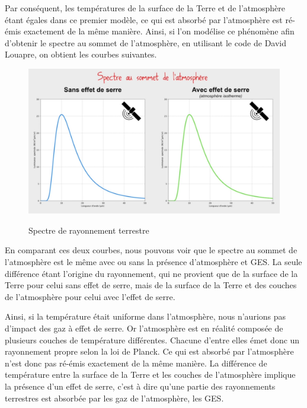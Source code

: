 \documentclass[a4paper, 12pt]{report} %
\newcommand{\figcaptionwithsource}[3]{\caption[#1 
            \newline #2]{#1} \addtocontents{lof}{\protect\vspace{1\baselineskip}}}
\begin{document}
Par conséquent, les températures de la surface de la Terre et de l’atmosphère étant égales dans ce 
premier modèle, ce qui est absorbé par l’atmosphère est ré-émis exactement de la même manière.
Ainsi, si l'on modélise ce phénomène afin d’obtenir le spectre au sommet de l’atmosphère, en utilisant le code de David Louapre, on obtient les courbes suivantes.

\begin{figure}[H]
    \begin{center}
    \includegraphics[scale=0.25]{Images/2modeles.png}
    \figcaptionwithsource{Spectre de rayonnement terrestre}{\url{https://www.youtube.com/watch?v=ewc8FBtEKPs}}{fig:figure1}
    \label{fig:figure1}
    \end{center} 
\end{figure}

En comparant ces deux courbes, nous pouvons voir que le spectre au sommet de l’atmosphère est le même avec ou sans la présence d'atmosphère et GES. La seule différence étant l’origine du 
rayonnement, qui ne provient que de la surface de la Terre pour celui sans effet de serre, mais de la surface de la Terre et des couches de l'atmosphère pour celui avec l’effet de serre. \vspace{\baselineskip}

Ainsi, si la température était uniforme dans l'atmosphère, nous n’aurions pas d’impact des gaz à effet de serre.
Or l’atmosphère est en réalité composée de plusieurs couches de température différentes. Chacune d’entre elles émet donc un rayonnement propre selon la loi de Planck. Ce qui est absorbé par l’atmosphère n’est donc pas ré-émis exactement de la même manière. La différence de température entre la surface de la Terre et les couches de l’atmosphère implique la présence d’un effet de serre, c'est à dire qu'une partie des rayonnements terrestres est absorbée par les gaz de l'atmosphère, les GES.
\end{document}
